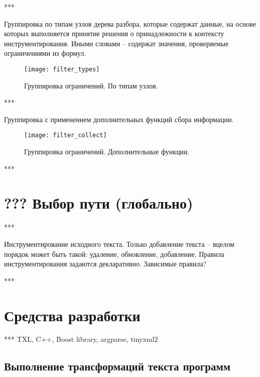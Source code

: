 ***

Группировка по типам узлов дерева разбора, которые содержат данные, на основе которых выполняется принятие решения о принадлежности к контексту инструментирования. Иными словами -- содержат значения, проверяемые ограничениями из формул.

\begin{figure}[H]
	\centering
	\texttt{[image: filter\_types]}
	\caption{Группировка ограничений. По типам узлов.}
	\label{fig:filter_types}
\end{figure}

***

Группировка с применением дополнительных функций сбора информации.

\begin{figure}[H]
	\centering
	\texttt{[image: filter\_collect]}
	\caption{Группировка ограничений. Дополнительные функции.}
	\label{fig:filter_collect}
\end{figure}

***

\section{??? Выбор пути (глобально)}

***

Инструментирование исходного текста.
Только добавление текста -- вцелом порядок может быть такой: удаление, обновление, добавление.
Правила инструментирования задаются декларативно.
Зависимые правила?

***

\section{Средства разработки}

***
TXL, C++, Boost library, argparse, tinyxml2

\subsection{Выполнение трансформаций текста программ}

